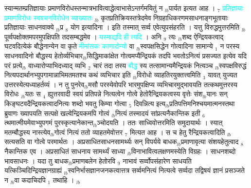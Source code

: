 \documentclass[article,12pt,a4paper]{memoir}%
\newcommand{\quotelemma}[1]{\textcolor{cyan}{#1}}
\begin{document}
	  
	  \pstart \leavevmode%
	स्यान्मतम्प्रतिज्ञायाः प्रमाणविरोधस्तन्मात्रभावित्वाद्धेत्वाभासेऽन्तर्गमयितुं न {\tiny $_{lb}$}पार्यत इत्यत आह । {\tiny $_{7}$} \quotelemma{प्रतिज्ञायाः प्रमाणविरोधः स्ववचनविरोधेन व्याख्यातः} \cite[12a2]{vn-msN} {\tiny $_{lb}$} कृतप्रतिक्रियस्तत्रेदमेव निग्रहाधिकरणमसाधनाङ्गभूतायाः प्रतिज्ञायाः साधनवाक्ये {\tiny $_{lb}$}प्र {\tiny $_{8}$} योग इत्यादिना । इति तस्मात् सर्व्व एवेत्युपसंहरति । यत्तु विरुद्धमुत्तरमिति {\tiny $_{lb}$}पूर्व्वपक्षोक्तमपरमुपक्षिपति तदसम्बद्धमेव । \quotelemma{यस्माद्यदि ही \cite[12a3]{vn-msN} त्यदि} । अनि {\tiny $_{9}$} \leavevmode{} त्यः {\tiny $_{lb}$}शब्द ऐन्द्रियकत्वाद् घटवदित्येकं बौद्धेनान्येन वा कृते \quotelemma{मीमांसकः काणादोन्यो} वा {\tiny $_{lb}$}स्वपक्षसिद्धेन गोत्वादिना सामान्ये {\tiny $_{1}$} न परस्य साधनवादिनो बौद्धस्य हेतोर्व्यभिचार{\tiny $_{lb}$}सिद्धिमाकांक्षेत गोत्वमप्यैन्द्रियकं तदपि भवतोऽनित्यं प्रसज्यत इत्येव यदि परं प्रत्ये{\tiny $_{lb}$}\leavevmode{} वाध्यारोप्याभिदध्याद् व्यभि {\tiny $_{2}$} चारं तदा तस्य \quotelemma{बौद्ध} स्य तत्सामान्यमैन्द्रियकं नित्यञ्च {\tiny $_{lb}$}स्वपक्षविरुद्धं नित्यपदार्थानभ्युपगामान्नाभिमतमतश्च कथं व्यभिचार इति {\tiny $_{lb}$}विरोधो व्याहतिरयुक्तत्त्वमिति {\tiny $_{3}$} यावत् युज्यत उत्तरस्येत्यध्याहर्तव्यं । न तु पुनरेव{\tiny $_{lb}$}मसौ परस्येवोपरि भारमुपक्षिप्य व्यभिचारमुद्भावयति तत्कथमुत्तरस्य विरोधः {\tiny $_{lb}$}यतः स {\tiny $_{4}$} ह्युत्तरवादी स्वयं प्रतिपन्ने नित्यत्वेन गोत्वे हेतोरैन्द्रियकत्वस्य वृत्तेः संश{\tiny $_{lb}$}यानः सन् किङ्घटवदैन्द्रियकत्वादनित्यः शब्दो भवतु किम्वा गोत्वा {\tiny $_{5}$} दिवन्नित्य इत्य{\tiny $_{lb}$}प्रतिपत्तिमनिश्चयमात्मनस्तथा ब्रुवाणः ख्यापयति सत्पक्षे खल्वेन्द्रियकमपि गोत्वं {\tiny $_{lb}$}नित्यं तस्मादयं सांप्रत्यनैकान्तिक इती {\tiny $_{6}$} त्थमात्मीयमेवाभ्युपगमं पुरस्कृत्यानेकान्त{\tiny $_{lb}$}ञ्चोदयति । ततः साध्विवोत्तरमिति समुदायार्थः । स्यात् मतम्बौद्धस्य नास्त्येव{\tiny $_{lb}$}गोत्वं नित्यं ततो व्याहतमेवोत्तर {\tiny $_{7}$} मित्यत आह । स च हेतु \cite[12a5]{vn-msN} रैन्द्रियकत्वादिति {\tiny $_{lb}$}सत्यसति वा गोत्वे परमार्थतः । अप्रसाधितसाधनसामर्थ्यः सन् विपर्यये बाधक{\tiny $_{lb}$}प्रमाणावृत्या संशयहेतुत्वाद {\tiny $_{8}$} नैकान्तिक एव । अप्रसाधितं साधनाय सामर्थ्यं साध्या {\tiny $_{lb}$}विनाभावित्वलक्षणमस्येति विग्रहः । साधनशब्दो भावसाधनः । यदा तु बाधक{\tiny $_{lb}$}प्रमाणबलेन हेतोरवि {\tiny $_{9}$} \leavevmode{} नाभावं सर्व्वोपसंहारेण साधयति यत्किञ्चिदिन्द्रियज्ञानग्राह्यं {\tiny $_{lb}$}स्वनिर्भासज्ञानजनकत्वात्तत्र सर्व्वमनित्यं नित्यत्वे सर्व्वदा तद्विषयं ज्ञानं प्रसञ्जते न {\tiny $_{lb}$}वा कदाचिदपि {\tiny $_{1}$} तथाहि । {\tiny $_{lb}$} 
	    \pend%
	  
\end{document}
